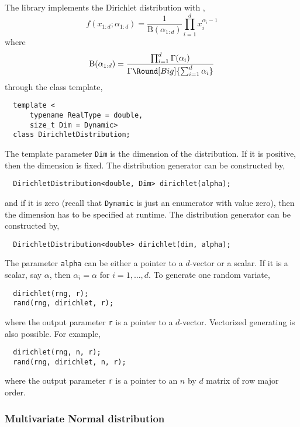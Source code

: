 The library implements the Dirichlet distribution with \pdf,
\begin{equation*}
  f(x_{1:d};\alpha_{1:d}) = \frac{1}{\mathrm{B}(\alpha_{1:d})}
  \prod_{i=1}^d x_i^{\alpha_i - 1}
\end{equation*}
where
\begin{equation*}
  \mathrm{B}(\alpha_{1:d}) =
  \frac{\prod_{i=1}^d\Gamma(\alpha_i)}
  {\Gamma\Round[Big]{\sum_{i=1}^d\alpha_i}}
\end{equation*}
through the class template,
\begin{Verbatim}
  template <
      typename RealType = double,
      size_t Dim = Dynamic>
  class DirichletDistribution;
\end{Verbatim}
The template parameter \verb|Dim| is the dimension of the distribution. If it
is positive, then the dimension is fixed. The distribution generator can be
constructed by,
\begin{Verbatim}
  DirichletDistribution<double, Dim> dirichlet(alpha);
\end{Verbatim}
and if it is zero (recall that \verb|Dynamic| is just an enumerator with value
zero), then the dimension has to be specified at runtime. The distribution
generator can be constructed by,
\begin{Verbatim}
  DirichletDistribution<double> dirichlet(dim, alpha);
\end{Verbatim}
The parameter \verb|alpha| can be either a pointer to a $d$-vector or a scalar.
If it is a scalar, say $\alpha$, then $\alpha_i = \alpha$ for $i = 1,\dots,d$.
To generate one random variate,
\begin{Verbatim}
  dirichlet(rng, r);
  rand(rng, dirichlet, r);
\end{Verbatim}
where the output parameter \verb|r| is a pointer to a $d$-vector. Vectorized
generating is also possible. For example,
\begin{Verbatim}
  dirichlet(rng, n, r);
  rand(rng, dirichlet, n, r);
\end{Verbatim}
where the output parameter \verb|r| is a pointer to an $n$ by $d$ matrix of row
major order.

\subsubsection{Multivariate Normal distribution}

